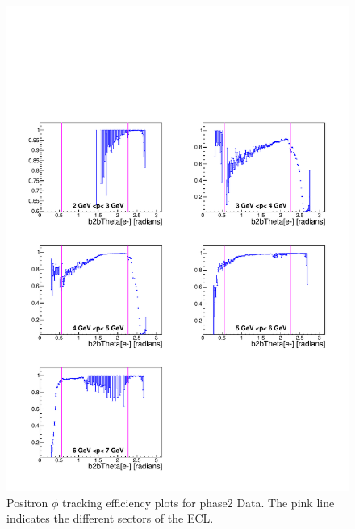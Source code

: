 \documentclass[a4paper,11pt,twosided,final,german,openbib,pdftex,listof=totoc,bibliography=totoc]{scrbook}
\begin{document}
\begin{appendix}
\begin{figure}[!htbp]
	\centering
	\includegraphics[width=\textwidth]{Plots/master/xPMThetaep_Data}
	\caption[Momentum $\theta$ Positron Efficiency Phase2 Data]{Positron $\phi$ tracking efficiency plots for phase2 Data. The pink line indicates the different sectors of the ECL.}
	\label{plt:PMThetaep_Data}
\end{figure}


\clearpage




\end{appendix}
\end{document}
